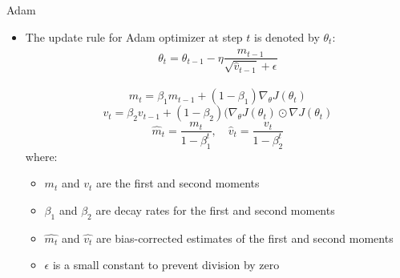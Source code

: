 \documentclass[serif, aspectratio=169]{beamer}
\begin{document}
\begin{frame}{Adam}
    \begin{itemize}
        \item The update rule for Adam optimizer at step $t$ is denoted by $\theta_t$:
        \[\theta_t = \theta_{t-1} - \eta \frac{\hat{m}_{t-1}}{\sqrt{\hat{v}_{t-1}} +\epsilon}\]\\
        \[m_t = \beta_1 m_{t-1} + (1 - \beta_1) \nabla_{\theta} J(\theta_t)\]
        \[v_t = \beta_2 v_{t-1} + (1 - \beta_2) (\nabla_{\theta} J(\theta_t) \odot \nabla J(\theta_t)\]
        \[\hat{m}_t = \frac{m_t}{1 - \beta_1^t}, \quad 
        \hat{v}_t = \frac{v_t}{1 -\beta_2^t}\]
        where:
        \begin{itemize}
            \item $m_t$ and $v_t$ are the first and second moments
            \item $\beta_1$ and $\beta_2$ are decay rates for the first and second moments
            \item $\hat{m_t}$ and $\hat{v_t}$ are bias-corrected estimates of the first and second moments
            \item $\epsilon$ is a small constant to prevent division by zero
        \end{itemize}
    \end{itemize}
\end{frame}
\end{document}
